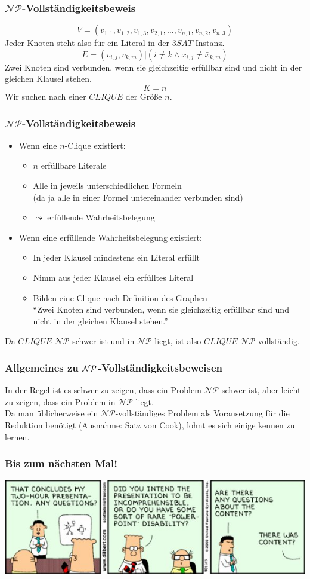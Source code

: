 \begin{frame}
\frametitle{$\mathcal{NP}$-Vollständigkeitsbeweis}
$$V = (v_{1,1}, v_{1,2}, v_{1,3}, v_{2,1},\ldots,v_{n,1},v_{n,2},v_{n,3})$$
Jeder Knoten steht also für ein Literal in der $3SAT$ Instanz. 
$$E = {(v_{i,j},v_{k,m})| (i \neq k \wedge x_{i,j} \neq \bar{x}_{k,m} )}$$%
Zwei Knoten sind verbunden, wenn sie gleichzeitig erfüllbar sind und nicht in der gleichen Klausel stehen. 
$$K = n$$
Wir suchen nach einer $CLIQUE$ der Größe $n$.\\
\end{frame}
\begin{frame}
\frametitle{$\mathcal{NP}$-Vollständigkeitsbeweis}
\begin{itemize}
\item Wenn eine $n$-Clique existiert:
\begin{itemize}
	\item $n$ erfüllbare Literale
	\item Alle in jeweils unterschiedlichen Formeln \\ \small{(da ja alle in einer Formel untereinander verbunden sind)}
	\item $\leadsto$ erfüllende Wahrheitsbelegung
\end{itemize}
\pause \item Wenn eine erfüllende Wahrheitsbelegung existiert:
\begin{itemize}
	\item In jeder Klausel mindestens ein Literal erfüllt
	\item Nimm aus jeder Klausel ein erfülltes Literal
	\item Bilden eine Clique nach Definition des Graphen \\ \small{"`Zwei Knoten sind verbunden, wenn sie gleichzeitig erfüllbar sind und nicht in der gleichen Klausel stehen."'}
\end{itemize}
\end{itemize}
\pause Da $CLIQUE$ $\mathcal{NP}$-schwer ist und in $\mathcal{NP}$ liegt, ist also $CLIQUE$ $\mathcal{NP}$-vollständig.
\end{frame}

\begin{frame}
\frametitle{Allgemeines zu $\mathcal{NP}$-Vollständigkeitsbeweisen}
In der Regel ist es schwer zu zeigen, dass ein Problem $\mathcal{NP}$-schwer ist, aber leicht zu zeigen, dass ein Problem in $\mathcal{NP}$ liegt.\\[8pt]
Da man üblicherweise ein $\mathcal{NP}$-vollständiges Problem als Vorausetzung für die Reduktion benötigt (Ausnahme: Satz von Cook), lohnt es sich einige kennen zu lernen.
\end{frame}

\begin{frame}
	\frametitle{Bis zum nächsten Mal!}
	
	\begin{center}
		\includegraphics[width=\textwidth]{images/221_strip.jpg}
	\end{center}
\end{frame}

